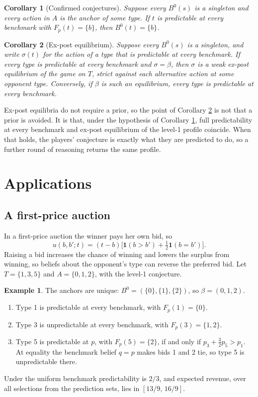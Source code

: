 \documentclass[12pt]{article}
\newtheorem{corollary}{Corollary}
\theoremstyle{definition}
\newtheorem{example}{Example}
\begin{document}
\begin{corollary}[Confirmed conjectures]\label{cor:coverage}
Suppose every $B^0(s)$ is a singleton and every action in $A$ is the anchor of some type. If $t$ is predictable at every benchmark with $F_p(t) = \{b\}$, then $B^0(t) = \{b\}$.
\end{corollary}

\begin{corollary}[Ex-post equilibrium]\label{cor:expost}
Suppose every $B^0(s)$ is a singleton, and write $\sigma(t)$ for the action of a type that is predictable at every benchmark. If every type is predictable at every benchmark and $\sigma = \beta$, then $\sigma$ is a weak ex-post equilibrium of the game on $T$, strict against each alternative action at some opponent type. Conversely, if $\beta$ is such an equilibrium, every type is predictable at every benchmark.
\end{corollary}

Ex-post equilibria do not require a prior, so the point of Corollary \ref{cor:expost} is not that a prior is avoided. It is that, under the hypothesis of Corollary \ref{cor:coverage}, full predictability at every benchmark and ex-post equilibrium of the level-1 profile coincide. When that holds, the players' conjecture is exactly what they are predicted to do, so a further round of reasoning returns the same profile.

\section{Applications}\label{sec:examples}

\subsection{A first-price auction}\label{sec:fpa}

In a first-price auction the winner pays her own bid, so
\[
u(b, b'; t) = (t - b)\bigl[\mathbf{1}(b > b') + \tfrac12 \mathbf{1}(b = b')\bigr].
\]
Raising a bid increases the chance of winning and lowers the surplus from winning, so beliefs about the opponent's type can reverse the preferred bid. Let $T = \{1, 3, 5\}$ and $A = \{0, 1, 2\}$, with the level-1 conjecture.

\begin{example}\label{ex:fpa}
The anchors are unique: $B^0 = (\{0\}, \{1\}, \{2\})$, so $\beta = (0, 1, 2)$.
\begin{enumerate}
\item[(i)] Type 1 is predictable at every benchmark, with $F_p(1) = \{0\}$.
\item[(ii)] Type 3 is unpredictable at every benchmark, with $F_p(3) = \{1, 2\}$.
\item[(iii)] Type 5 is predictable at $p$, with $F_p(5) = \{2\}$, if and only if $p_3 + \tfrac{3}{2} p_5 > p_1$. At equality the benchmark belief $q = p$ makes bids 1 and 2 tie, so type 5 is unpredictable there.
\end{enumerate}
Under the uniform benchmark predictability is $2/3$, and expected revenue, over all selections from the prediction sets, lies in $[13/9,\, 16/9]$.
\end{example}
\end{document}
